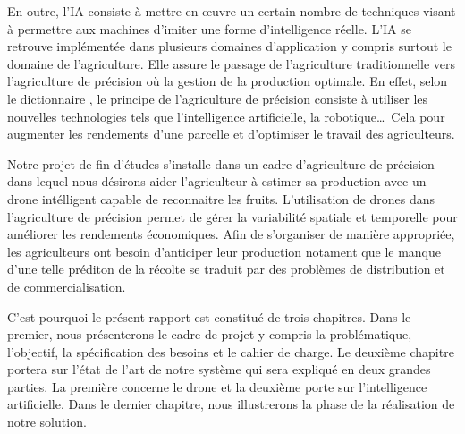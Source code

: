 En outre, l'IA consiste à mettre en œuvre un certain nombre de techniques visant à permettre aux machines d'imiter une forme d'intelligence réelle. L'IA se retrouve implémentée dans plusieurs domaines d'application\cite{netactions} y compris surtout le domaine de l'agriculture. Elle assure le passage de l'agriculture traditionnelle vers l'agriculture de précision où la gestion de la production optimale. En effet, selon le dictionnaire \cite{leshorizons}, le principe de l'agriculture de précision consiste à utiliser les nouvelles technologies tels que l'intelligence artificielle, la robotique\ldots\ Cela pour augmenter les rendements d'une parcelle et d'optimiser le travail des agriculteurs.

Notre projet de fin d'études s'installe dans un cadre d'agriculture de précision dans lequel nous désirons aider l'agriculteur à estimer sa production avec un drone intélligent capable de reconnaitre les fruits. L'utilisation de drones dans l'agriculture de précision permet de gérer la variabilité spatiale et temporelle pour améliorer les rendements économiques. Afin de s'organiser de manière appropriée, les agriculteurs ont besoin d'anticiper leur production notament que le manque d'une telle préditon de la récolte se traduit par des problèmes de distribution et de commercialisation.

C'est pourquoi le présent rapport est constitué de trois chapitres. 
Dans le premier, nous présenterons le cadre de projet y compris la problématique, l'objectif, la spécification des besoins et le cahier de charge. 
 Le deuxième chapitre portera sur l'état de l'art de notre système qui sera expliqué en deux grandes parties. La première concerne le drone et la deuxième porte sur l'intelligence artificielle. Dans le dernier chapitre, nous illustrerons la phase de la réalisation de notre solution.